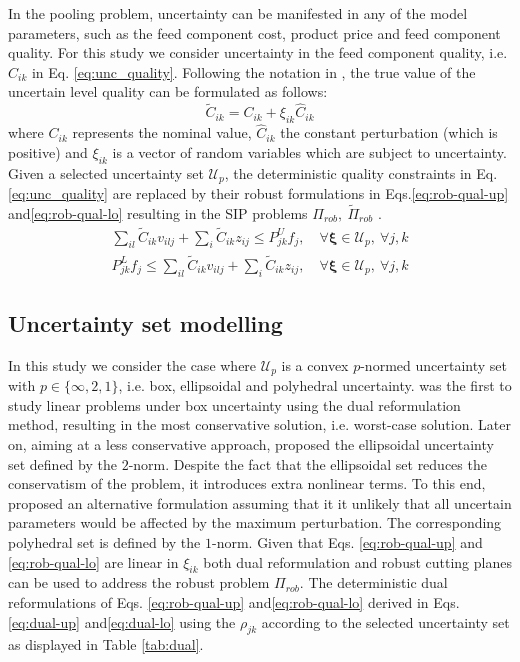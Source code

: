 \documentclass[sn-mathphys-num]{sn-jnl}
\begin{document}
In the pooling problem, uncertainty can be manifested in any of the model parameters, such as the feed component cost, product price and feed component quality. For this study we consider uncertainty in the feed component quality, i.e. $C_{ik}$ in Eq. \eqref{eq:unc_quality}. Following the notation in \cite{Li2011}, the true value of the uncertain level quality  can be formulated as follows:
\begin{equation}\label{eq:unc-def}
\tilde{C}_{ik}=C_{ik}+\xi_{ik} \hat{C}_{ik}    
\end{equation}
where  $C_{ik}$ represents the nominal value, $\hat{C}_{ik}$ the constant perturbation (which is positive) and $\xi_{ik}$ is a vector of random variables which are subject to uncertainty. Given a selected uncertainty set $\mathcal{U}_{p}$, the  deterministic quality constraints in Eq. \eqref{eq:unc_quality} are replaced by their robust formulations in Eqs.\eqref{eq:rob-qual-up} and\eqref{eq:rob-qual-lo} resulting in the SIP problems  $\Pi_{rob},~\tilde{\Pi}_{rob}$ \citep{Bental02RO}.
\begin{align}
 \sum_{il}\tilde{C}_{ik} v_{ilj}+ \sum_i \tilde{C}_{ik} z_{ij}\leq P_{jk}^U f_j, \quad \forall \boldsymbol{\xi}\in \mathcal{U}_{p},~ \forall j,k \label{eq:rob-qual-up}\\ 
 P_{jk}^L f_j\leq \sum_{il}\tilde{C}_{ik} v_{ilj}+ \sum_i \tilde{C}_{ik} z_{ij}, \quad \forall \boldsymbol{\xi}\in \mathcal{U}_{p},~ \forall j,k \label{eq:rob-qual-lo}
\end{align}
\subsection{Uncertainty set modelling}
In this study we consider the case where $\mathcal{U}_{p}$ is a convex $p$-normed uncertainty set with $p\in \{\infty,2,1\}$, i.e. box, ellipsoidal and polyhedral uncertainty. \citet{Soyster73} was the first to study linear problems under box uncertainty using the dual reformulation method, resulting in the most conservative solution, i.e. worst-case solution.
Later on, \citet{Bental00} aiming at a less conservative approach, proposed the ellipsoidal uncertainty set defined by the $2$-norm. Despite the fact that the ellipsoidal set reduces the conservatism of the problem, it introduces extra nonlinear terms. To this end, \citet{Bertsimas04} proposed an alternative formulation assuming that it it unlikely that all uncertain parameters would be affected by the maximum perturbation. The corresponding polyhedral set is defined by the $1$-norm. Given that Eqs. \eqref{eq:rob-qual-up} and \eqref{eq:rob-qual-lo} are linear in $\xi_{ik}$ both dual reformulation and robust cutting planes can be used to address the robust problem $\Pi_{rob}$. The deterministic dual reformulations of Eqs. \eqref{eq:rob-qual-up} and\eqref{eq:rob-qual-lo} derived in Eqs. \eqref{eq:dual-up} and\eqref{eq:dual-lo} using the $\rho_{jk}$ according to the selected uncertainty set as displayed in Table \ref{tab:dual}.
\end{document}
